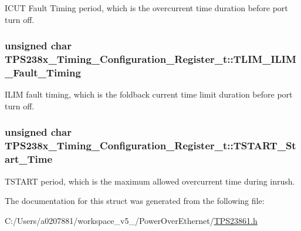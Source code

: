I\-C\-U\-T Fault Timing period, which is the overcurrent time duration before port turn off. 

\hypertarget{struct_t_p_s238x___timing___configuration___register__t_a2635690243edb947f167f83c38c42e13}{
\subsubsection[{T\-L\-I\-M\-\_\-\-I\-L\-I\-M\-\_\-\-Fault\-\_\-\-Timing}]{\setlength{\rightskip}{0pt plus 5cm}unsigned char T\-P\-S238x\-\_\-\-Timing\-\_\-\-Configuration\-\_\-\-Register\-\_\-t\-::\-T\-L\-I\-M\-\_\-\-I\-L\-I\-M\-\_\-\-Fault\-\_\-\-Timing}}\label{struct_t_p_s238x___timing___configuration___register__t_a2635690243edb947f167f83c38c42e13}


I\-L\-I\-M fault timing, which is the foldback current time limit duration before port turn off. 

\hypertarget{struct_t_p_s238x___timing___configuration___register__t_aef10bd8d63cf53434ef90a8d135e9760}{
\subsubsection[{T\-S\-T\-A\-R\-T\-\_\-\-Start\-\_\-\-Time}]{\setlength{\rightskip}{0pt plus 5cm}unsigned char T\-P\-S238x\-\_\-\-Timing\-\_\-\-Configuration\-\_\-\-Register\-\_\-t\-::\-T\-S\-T\-A\-R\-T\-\_\-\-Start\-\_\-\-Time}}\label{struct_t_p_s238x___timing___configuration___register__t_aef10bd8d63cf53434ef90a8d135e9760}


T\-S\-T\-A\-R\-T period, which is the maximum allowed overcurrent time during inrush. 



The documentation for this struct was generated from the following file\-:\begin{DoxyCompactItemize}
\item 
C\-:/\-Users/a0207881/workspace\-\_\-v5\-\_/\-Power\-Over\-Ethernet/\hyperlink{_t_p_s23861_8h}{T\-P\-S23861.\-h}\end{DoxyCompactItemize}
